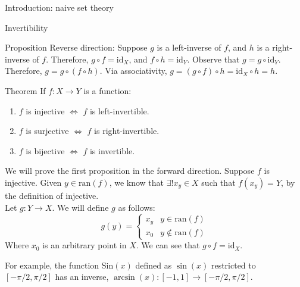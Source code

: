 \documentclass[8pt]{extarticle}
\begin{document}
\begin{problem}{Introduction: naive set theory}
\begin{problem}{Invertibility}
\begin{problem}{Proposition}
          Reverse direction: Suppose $g$ is a left-inverse of $f$, and $h$ is a right-inverse of $f$. Therefore, $g\circ f = \textrm{id}_X$, and $f\circ h = \textrm{id}_Y$. Observe that $g = g\circ \textrm{id}_Y$. Therefore, $g = g\circ(f\circ h)$. Via associativity, $g = (g\circ f)\circ h = \textrm{id}_X \circ h = h$.
      \end{problem}
      \begin{problem}{Theorem}
        If $f:X\rightarrow Y$ is a function:
        \begin{enumerate}
          \item $f$ is injective $\Leftrightarrow$ $f$ is left-invertible.
          \item $f$ is surjective $\Leftrightarrow$ $f$ is right-invertible.
          \item $f$ is bijective $\Leftrightarrow$ $f$ is invertible.
        \end{enumerate}
        \tcblower
        We will prove the first proposition in the forward direction. Suppose $f$ is injective. Given $y\in \textrm{ran}(f)$, we know that $\exists! x_y\in X$ such that $f(x_y) = Y$, by the definition of injective.\\

        Let $g:Y\rightarrow X$. We will define $g$ as follows:
        \[
          g(y) = \begin{cases}
            x_y & y\in \textrm{ran}(f) \\
            x_0 & y\notin \textrm{ran}(f)
          \end{cases}
        \] 
        Where $x_0$ is an arbitrary point in $X$. We can see that $g\circ f = \textrm{id}_X$.
      \end{problem}
      For example, the function $\textrm{Sin}(x)$ defined as $\sin(x)$ restricted to $[-\pi/2,\pi/2]$ has an inverse, $\arcsin(x):[-1,1] \rightarrow [-\pi/2,\pi/2]$.
    \end{problem}
  \end{problem}
\end{document}
